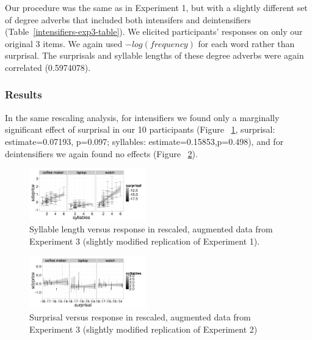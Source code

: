 \documentclass[10pt,letterpaper]{article}
\begin{document}
      Our procedure was the same as in Experiment 1, but with a slightly different set of degree adverbs that included both intensifers and deintensifiers (Table~\ref{intensifiers-exp3-table}). We elicited participants' responses on only our original 3 items. We again used $-log(frequency)$ for each word rather than surprisal. The surprisals and syllable lengths of these degree adverbs were again correlated (0.5974078).
  
  \subsubsection{Results}
    In the same rescaling analysis, for intensifiers we found only a marginally significant effect of surprisal in our 10 participants (Figure ~\ref{exp3-intensifiers}, surprisal: estimate=0.07193, p=0.097; syllables: estimate=0.15853,p=0.498), and for deintensifiers we again found no effects (Figure ~\ref{exp3-deintensifiers}).
  
    \begin{figure}[ht]
    \begin{center}
    \includegraphics[width=0.45\textwidth]{exp3-intensifiers-scaled-syllables.png}
    \end{center}
    \caption{Syllable length versus response in rescaled, augmented data from Experiment 3 (slightly modified replication of Experiment 1).} 
    \label{exp3-intensifiers}
    \end{figure}
    
    \begin{figure}[ht]
    \begin{center}
    \includegraphics[width=0.45\textwidth]{exp3-deintensifiers-scaled.png}
    \end{center}
    \caption{Surprisal versus response in rescaled, augmented data from Experiment 3 (slightly modified replication of Experiment 2)} 
    \label{exp3-deintensifiers}
    \end{figure}
  
\end{document}
